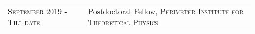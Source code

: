 \vspace*{-1.6cm}
\begin{longtable}{R{2.5cm}|p{14.8cm}}
 	\textsc{September 2019 - Till date} & Postdoctoral Fellow, \textsc{Perimeter Institute for Theoretical Physics} \\
\end{longtable}
